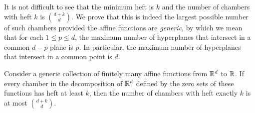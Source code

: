 \documentclass[a4paper,UKenglish,cleveref, autoref,numberwithinsect]{socg-lipics-v2021}
\newcommand {\mm}[1] {\ifmmode{#1}\else{\mbox{\(#1\)}}\fi}
\theoremstyle{plain}
\newcommand{\Rspace}        {\mm{{\mathbb R}}}
\begin{document}
It is not difficult to see that the minimum heft is $k$ and the number of chambers with heft $k$ is $\binom{d+k}{d}$.
We prove that this is indeed the largest possible number of such chambers provided the affine functions are \emph{generic}, by which we mean that for each $1 \leq p \leq d$, the maximum number of hyperplanes that intersect in a common $d-p$ plane is $p$.
In particular, the maximum number of hyperplanes that intersect in a common point is $d$.
\begin{theorem}
  \label{thm:repeated_minimum_heft}
  Consider a generic collection of finitely many affine functions from $\Rspace^d$ to $\Rspace$.
  If every chamber in the decomposition of $\Rspace^d$ defined by the zero sets of these functions has heft at least $k$, then the number of chambers with heft exactly $k$ is at most $\binom{d+k}{d}$.
\end{theorem}
\end{document}
